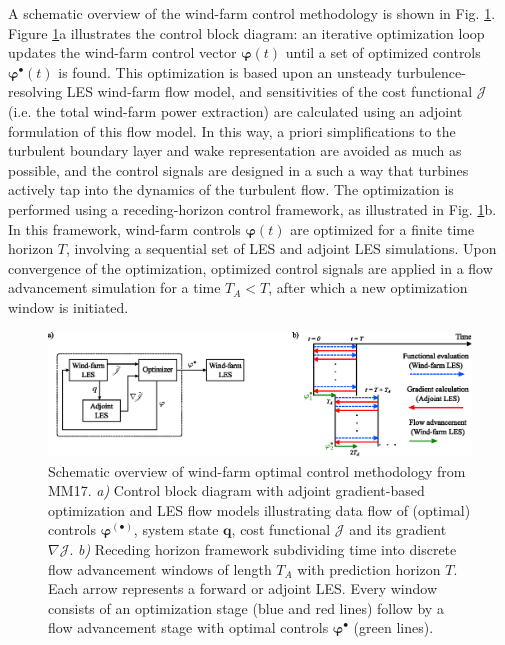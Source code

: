 \documentclass[wes, manuscript]{copernicus}
\begin{document}
A schematic overview of the wind-farm control methodology is shown in Fig. \ref{fig:optimization_meth}. Figure \ref{fig:optimization_meth}a illustrates the control block diagram: an iterative optimization loop updates the wind-farm control vector $\boldsymbol{\varphi}(t)$ until a set of optimized controls $\boldsymbol{\varphi}^{\bullet}(t)$ is found. This optimization is based upon an unsteady turbulence-resolving LES wind-farm flow model, and sensitivities of the cost functional $\mathscr{J}$ (i.e. the total wind-farm power extraction) are calculated using an adjoint formulation of this flow model. In this way, a priori simplifications to the turbulent boundary layer and wake representation are avoided as much as possible, and the control signals are designed in a such a way that turbines actively tap into the dynamics of the turbulent flow. The optimization is performed using a receding-horizon control framework, as illustrated in Fig. \ref{fig:optimization_meth}b. In this framework, wind-farm controls $\boldsymbol{\varphi}(t)$ are optimized for a finite time horizon $T$, involving a sequential set of LES and adjoint LES simulations. Upon convergence of the optimization, optimized control signals are applied in a flow advancement simulation for a time $T_A < T$, after which a new optimization window is initiated. 

\begin{figure}
	\includegraphics[width=\textwidth]{figure1.eps}
	\caption{Schematic overview of wind-farm optimal control methodology from MM17. \emph{a)} Control block diagram with adjoint gradient-based optimization and LES flow models illustrating data flow of (optimal) controls $\boldsymbol{\varphi}^{(\bullet)}$, system state $\boldsymbol{q}$, cost functional $\mathscr{J}$ and its gradient $\nabla \mathscr{J}$. \emph{b)} Receding horizon framework subdividing time into discrete flow advancement windows of length $T_A$ with prediction horizon $T$. Each arrow represents a forward or adjoint LES. Every window consists of an optimization stage (blue and red lines) follow by a flow advancement stage with optimal controls $\boldsymbol{\varphi}^{\bullet}$ (green lines).  \label{fig:optimization_meth}}
\end{figure}
\end{document}
